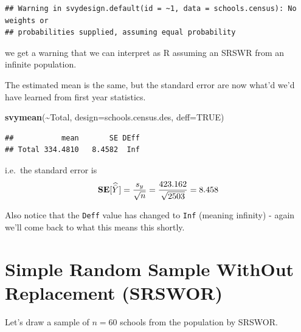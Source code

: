 \documentclass[
]{book}
\newenvironment{Shaded}{\begin{snugshade}}{\end{snugshade}}
\newcommand{\AttributeTok}[1]{\textcolor[rgb]{0.13,0.29,0.53}{#1}}
\newcommand{\ConstantTok}[1]{\textcolor[rgb]{0.56,0.35,0.01}{#1}}
\newcommand{\FunctionTok}[1]{\textcolor[rgb]{0.13,0.29,0.53}{\textbf{#1}}}
\newcommand{\NormalTok}[1]{#1}
\newcommand{\OtherTok}[1]{\textcolor[rgb]{0.56,0.35,0.01}{#1}}
\newcommand{\SpecialCharTok}[1]{\textcolor[rgb]{0.81,0.36,0.00}{\textbf{#1}}}
\newcommand{\bfa}[2]{{\rm\bf #1}[#2]}
\begin{document}
\begin{verbatim}
## Warning in svydesign.default(id = ~1, data = schools.census): No weights or
## probabilities supplied, assuming equal probability
\end{verbatim}

we get a warning that we can interpret as R assuming an SRSWR from an infinite population.

The estimated mean is the same, but the standard error are now what'd we'd have learned
from first year statistics.

\begin{Shaded}
\begin{Highlighting}[]
\FunctionTok{svymean}\NormalTok{(}\SpecialCharTok{\textasciitilde{}}\NormalTok{Total, }\AttributeTok{design=}\NormalTok{schools.census.des, }\AttributeTok{deff=}\ConstantTok{TRUE}\NormalTok{)}
\end{Highlighting}
\end{Shaded}

\begin{verbatim}
##           mean       SE DEff
## Total 334.4810   8.4582  Inf
\end{verbatim}

\begin{Shaded}
\end{Shaded}

i.e.~the standard error is
\[
   \bfa{SE}{\widehat{\bar{Y}}} 
   = \frac{s_y}{\sqrt{n}} 
   = \frac{423.162}{\sqrt{2503}} = 8.458
\]

Also notice that the \texttt{Deff} value has changed to \texttt{Inf} (meaning infinity) -
again we'll come back to what this means this shortly.

\section{Simple Random Sample WithOut Replacement (SRSWOR)}\label{simple-random-sample-without-replacement-srswor}

Let's draw a sample of \(n=60\) schools from the population by SRSWOR.
\end{document}
